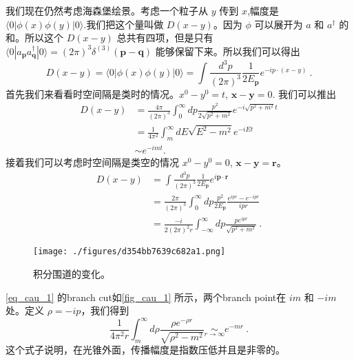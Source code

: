 
我们现在仍然考虑海森堡绘景。考虑一个粒子从 $y$ 传到 $x$,幅度是 $\langle 0 |\phi(x)\phi(y)| 0 \rangle$.我们把这个量叫做 $D(x-y)$。因为 $\phi$ 可以展开为 $a$ 和 $a^\dagger$ 的和。所以这个 $D(x-y)$ 总共有四项，但是只有 $\langle 0 | a_{\mathbf p} a^\dagger_{\mathbf q} | 0 \rangle = (2\pi)^3 \delta^{(3)}(\mathbf p - \mathbf q)$ 能够保留下来。所以我们可以得出
\begin{equation}
D(x-y)=\langle 0|\phi(x) \phi(y)| 0\rangle=\int \frac{d^{3} p}{(2 \pi)^{3}} \frac{1}{2 E_{\mathbf{p}}} e^{-i p \cdot(x-y)}~.
\end{equation}
首先我们来看看时空间隔是类时的情况。$x^0 - y^0 = t$, $\mathbf x - \mathbf y = 0$. 我们可以推出
\begin{equation}
\begin{aligned}
D(x-y) &=\frac{4 \pi}{(2 \pi)^{3}} \int_{0}^{\infty} d p \frac{p^{2}}{2 \sqrt{p^{2}+m^{2}}} e^{-i \sqrt{p^{2}+m^{2}} t} \\
&=\frac{1}{4 \pi^{2}} \int_{m}^{\infty} d E \sqrt{E^{2}-m^{2}} e^{-i E t} \\
& \sim e^{-i m t} .
\end{aligned}
\end{equation}
接着我们可以考虑时空间隔是类空的情况 $x^0 - y^0 = 0$, $\mathbf x - \mathbf y = \mathbf r$。
\begin{equation}\label{eq_cau_1}
\begin{aligned}
D(x-y) &=\int \frac{d^{3} p}{(2 \pi)^{3}} \frac{1}{2 E_{\mathbf{p}}} e^{i \mathbf{p} \cdot \mathbf{r}} \\
&=\frac{2 \pi}{(2 \pi)^{3}} \int_{0}^{\infty} d p \frac{p^{2}}{2 E_{\mathbf{p}}} \frac{e^{i p r}-e^{-i p r}}{i p r} \\
&=\frac{-i}{2(2 \pi)^{2} r} \int_{-\infty}^{\infty} d p \frac{p e^{i p r}}{\sqrt{p^{2}+m^{2}}}~.
\end{aligned}
\end{equation}
\begin{figure}[ht]
\centering
\texttt{[image: ./figures/d354bb7639c682a1.png]}
\caption{积分围道的变化。} \label{fig_cau_1}
\end{figure}
\autoref{eq_cau_1} 的branch cut如\autoref{fig_cau_1} 所示，两个branch point在 $im$ 和 $-im$ 处。定义 $\rho = -ip$，我们得到
\begin{equation}
\frac{1}{4 \pi^{2} r} \int_{m}^{\infty} d \rho \frac{\rho e^{-\rho r}}{\sqrt{\rho^{2}-m^{2}}} \underset{r \rightarrow \infty}{\sim} e^{-m r}~.
\end{equation}
这个式子说明，在光锥外面，传播幅度是指数压低并且是非零的。

